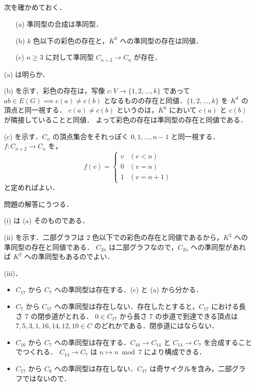 \subsection{}
次を確かめておく．
\begin{enumerate}
 \item[(a)] 準同型の合成は準同型．
 \item[(b)] $k$ 色以下の彩色の存在と，$K^{k}$ への準同型の存在は同値．
 \item[(c)] $n\geq 3$ に対して準同型 $C_{n+2}\longrightarrow C_n$ が存在．
\end{enumerate}

(a) は明らか．

(b) を示す．彩色の存在は，写像 $c\colon V\longrightarrow \{1,2,\ldots,k\}$ であって
$ab\in E(G)\implies c(a)\neq c(b)$ となるものの存在と同値．$\{1,2,\ldots,k\}$ を $K^{k}$ の頂点と同一視する．
$c(a)\neq c(b)$ というのは，$K^k$ において $c(a)$ と $c(b)$ が隣接していることと同値．
よって彩色の存在は準同型の存在と同値である．

(c) を示す．$C_n$ の頂点集合をそれっぽく $0,1,\ldots,n-1$ と同一視する．
$f\colon C_{n+2}\longrightarrow C_n$ を，
\[
 f(v) = \begin{cases} v & (v < n)\\ 0& (v = n) \\ 1 & (v = n + 1)\end{cases}
\]
と定めればよい．

問題の解答にうつる．

(i) は (a) そのものである．

(ii) を示す．二部グラフは $2$ 色以下での彩色の存在と同値であるから，$K^2$ への準同型の存在と同値である．
$C_{2n}$ は二部グラフなので，$C_{2n}$ への準同型があれば $K^2$ への準同型もあるのでよい．

(iii)．
\begin{itemize}
 \item $C_{17}$ から $C_7$ への準同型は存在する．(c) と (a) から分かる．
 \item $C_7$ から $C_{17}$ への準同型は存在しない．存在したとすると，$C_{17}$ における長さ $7$ の閉歩道がとれる．
 $0\in C_{17}$ から長さ $7$ の歩道で到達できる頂点は $7,5,3,1,16,14,12,10\in C$ のどれかである．閉歩道にはならない．
 \item $C_{16}$ から $C_7$ への準同型は存在する．$C_{16}\longrightarrow C_{14}$ と $C_{14}\longrightarrow C_7$ を合成することでつくれる．
 $C_{14}\longrightarrow C_7$ は $n\longmapsto n\bmod 7$ により構成できる．
 \item $C_{17}$ から $C_6$ への準同型は存在しない．$C_{17}$ は奇サイクルを含み，二部グラフではないので．
\end{itemize}